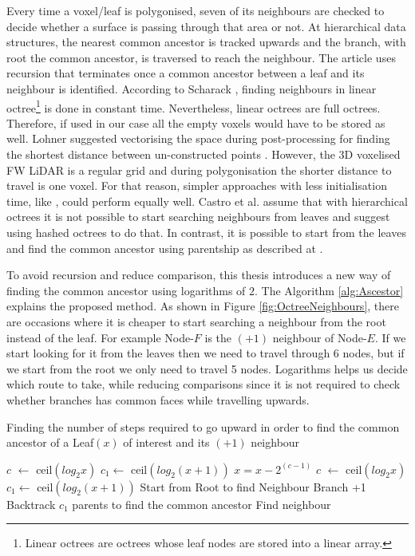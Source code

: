 \documentclass{subfiles}
\begin{document}
\par Every time a voxel/leaf is polygonised, seven of its neighbours are checked to decide whether a surface is passing through that area or not. At hierarchical data structures, the nearest common ancestor is tracked upwards and the branch, with root the common ancestor, is traversed to reach the neighbour. The article \cite{Hanan1989} uses recursion that terminates once a common ancestor between a leaf and its neighbour is identified. According to Scharack \cite{Schrack1992}, finding neighbours in linear octree\footnote{{\color{blue} Linear octrees are octrees whose leaf nodes are stored into a linear array. }} is done in constant time. Nevertheless, linear octrees are full octrees. Therefore, if used in our case all the empty voxels would have to be stored as well. Lohner suggested vectorising the space during post-processing for finding the shortest distance between un-constructed points \cite{Lohner1994}. However, the 3D voxelised FW LiDAR is a regular grid and during polygonisation the shorter distance to travel is one voxel. For that reason, simpler approaches with less initialisation time, like \cite{Schrack1992}, could perform equally well. Castro et al. \cite{Castro2008} assume that with hierarchical octrees it is not possible to start searching neighbours from leaves and suggest using hashed octrees to do that. In contrast, it is possible to start from the leaves and find the common ancestor using parentship as described at \cite{Hanan1989}.

\par To avoid recursion and reduce comparison, this thesis introduces a new way of finding the  common ancestor using logarithms of $2$. The Algorithm \ref{alg:Ascestor} explains the proposed method. As shown in Figure \ref{fig:OctreeNeighbours}, there are occasions where it is cheaper to start searching a neighbour from the root instead of the leaf. For example Node-$F$ is the $(+1)$ neighbour of Node-$E$. If we start looking for it from the leaves then we need to travel through 6 nodes, but if we start from the root we only need to travel 5 nodes. Logarithms helps us decide which route to take, while reducing comparisons since it is not required to check whether branches has common faces while travelling upwards\cite{Hanan1989}.

\begin{algorithm}[!htbp]
	\caption{Finding the number of steps required to go upward in order to find the common ancestor of a Leaf$(x)$ of interest and its $(+1)$ neighbour}
	\label{alg:Ascestor}
	\centering
	\begin{algorithmic}[1]
		\State $c $  $\gets$ ceil$(log_2 x)$
		\State $c_1 \gets$ ceil$(log_2 (x+1))$
		\State $x = x - 2^{(c-1)} $
		\State $c $  $\gets$ ceil$(log_2 x)$
		\State $c_1 \gets$ ceil$(log_2 (x+1))$		
		\EndWhile
		\State Start from Root to find Neighbour Branch +1
		\Else
		\State Backtrack $c_1$ parents to find the common ancestor
		\State Find neighbour
		\EndIf
	\end{algorithmic}
\end{algorithm}
\end{document}
